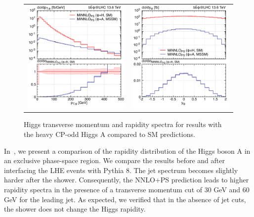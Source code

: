 \documentclass[11pt,a4paper]{article}
\begin{document}
\begin{figure}[t!]
\begin{center}
\begin{tabular}{cc}
\includegraphics[width=.45\textwidth, page=1]{plots/5fs/BSM/pt_Higgs.pdf}&
\includegraphics[width=.45\textwidth, page=1]{plots/5fs/BSM/y_Higgs.pdf}
\end{tabular}
\vspace*{1ex}
\caption{Higgs transverse momentum and rapidity spectra for \minnlo{} results with the heavy CP-odd Higgs $\text{A}$ compared to SM predictions.\label{fig:SMvsBSM}}
\end{center}
\end{figure}

In~, we present a comparison of the rapidity distribution of the Higgs boson A in an exclusive phase-space region. We compare the results before and after interfacing the LHE events with Pythia 8. The jet spectrum becomes slightly harder after the shower. Consequently, the NNLO+PS prediction leads to higher rapidity spectra in the presence of a transverse momentum cut of 30 GeV and 60 GeV for the leading jet. As expected, we verified that in the absence of jet cuts, the shower does not change the Higgs rapidity.  
\end{document}
